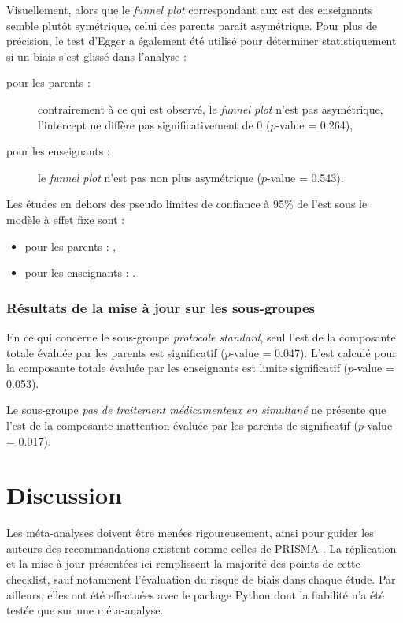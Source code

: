 Visuellement, alors que le \textit{funnel plot} correspondant aux \gls{est} des enseignants semble plutôt symétrique, celui des parents parait asymétrique. 
Pour plus de précision, le test d'Egger a également été utilisé pour déterminer statistiquement si un biais s'est glissé dans l'analyse \citep{Egger1997} :
\begin{description}
\item[pour les parents :] contrairement à ce qui est observé, le \textit{funnel plot} n'est pas asymétrique, l'intercept ne diffère pas 
significativement de 0 ($p$-value = 0.264),
\item[pour les enseignants :]  le \textit{funnel plot} n'est pas non plus asymétrique ($p$-value = 0.543).
\end{description}

Les études en dehors des pseudo limites de confiance à 95\% de l'\gls{est} sous le modèle à effet fixe sont : 
\begin{itemize}
\item pour les parents : \citet{Christiansen2014}, 
\item pour les enseignants : \citet{Moreno2019, Shereena2019}. 
\end{itemize}
 
\subsubsection{Résultats de la mise à jour sur les sous-groupes}
 
En ce qui concerne le sous-groupe \emph{protocole standard}, seul l'\gls{est} de la composante totale évaluée par les parents est significatif ($p$-value = 0.047). 
L'\gls{est} calculé pour la composante totale évaluée par les enseignants est limite significatif ($p$-value = 0.053).

Le sous-groupe \emph{pas de traitement médicamenteux en simultané} ne présente que l'\gls{est} de la composante inattention évaluée par les parents de 
significatif ($p$-value = 0.017).

\section{Discussion} 

Les méta-analyses doivent être menées rigoureusement, ainsi pour guider les auteurs des recommandations existent comme celles de PRISMA \citep{Moher2009}.
La réplication et la mise à jour présentées ici remplissent la majorité des points de cette checklist, sauf notamment l'évaluation du risque de biais dans chaque étude.
Par ailleurs, elles ont été effectuées avec le package Python dont la fiabilité n'a été testée que sur une méta-analyse.
 
